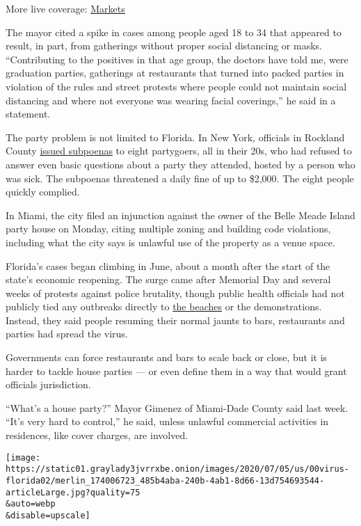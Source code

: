 More live coverage:
\href{https://www.nytimes3xbfgragh.onion/live/2020/08/04/business/stock-market-today-coronavirus?action=click\&pgtype=Article\&state=default\&region=MAIN_CONTENT_1\&context=storylines_live_updates}{Markets}

The mayor cited a spike in cases among people aged 18 to 34 that
appeared to result, in part, from gatherings without proper social
distancing or masks. ``Contributing to the positives in that age group,
the doctors have told me, were graduation parties, gatherings at
restaurants that turned into packed parties in violation of the rules
and street protests where people could not maintain social distancing
and where not everyone was wearing facial coverings,'' he said in a
statement.

The party problem is not limited to Florida. In New York, officials in
Rockland County
\href{https://www.nytimes3xbfgragh.onion/2020/07/01/nyregion/rockland-coronavirus-party.html}{issued
subpoenas} to eight partygoers, all in their 20s, who had refused to
answer even basic questions about a party they attended, hosted by a
person who was sick. The subpoenas threatened a daily fine of up to
\$2,000. The eight people quickly complied.

In Miami, the city filed an injunction against the owner of the Belle
Meade Island party house on Monday, citing multiple zoning and building
code violations, including what the city says is unlawful use of the
property as a venue space.

Florida's cases began climbing in June, about a month after the start of
the state's economic reopening. The surge came after Memorial Day and
several weeks of protests against police brutality, though public health
officials had not publicly tied any outbreaks directly to
\href{https://www.nytimes3xbfgragh.onion/2020/04/30/us/newsom-beaches-california-coronavirus.html}{the
beaches} or the demonstrations. Instead, they said people resuming their
normal jaunts to bars, restaurants and parties had spread the virus.

Governments can force restaurants and bars to scale back or close, but
it is harder to tackle house parties --- or even define them in a way
that would grant officials jurisdiction.

``What's a house party?'' Mayor Gimenez of Miami-Dade County said last
week. ``It's very hard to control,'' he said, unless unlawful commercial
activities in residences, like cover charges, are involved.

\texttt{[image: https://static01.graylady3jvrrxbe.onion/images/2020/07/05/us/00virus-florida02/merlin\_174006723\_485b4aba-240b-4ab1-8d66-13d754693544-articleLarge.jpg?quality=75\\\&auto=webp\\\&disable=upscale]}

